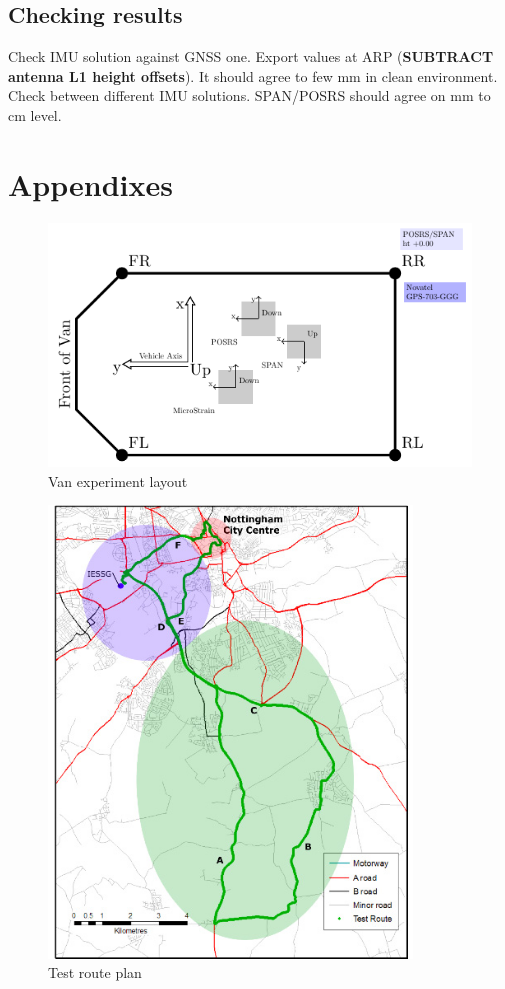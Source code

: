 \documentclass[british]{book}
\begin{document}
\section{Checking results}
Check IMU solution against GNSS one. Export values at ARP (\textbf{SUBTRACT antenna L1 height offsets}). It should agree to few mm in clean environment.  Check between different IMU solutions. SPAN/POSRS should agree on mm to cm level.




\chapter{Appendixes}


\begin{figure}[tbh]
\centering\includegraphics[clip,width=12cm]{pic/VanLayout}%
\caption{Van experiment layout\label{fig:Van-experiment-layout}}
\end{figure}
\begin{figure}[tbh]
\centering\includegraphics[clip,height=12cm]{pic/TrajectoryLayout}%
\caption{Test route plan\label{fig:Van-trajectory}}
\end{figure}
\end{document}
